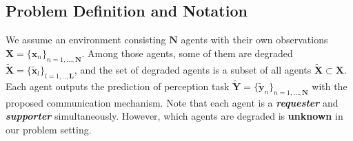 \subsection{Problem Definition and Notation}
We assume an environment consisting $\bm{N}$ agents with their own observations $\bm{X}=\{\bm{x}_n\}_{n=1,...,\bm{N}}$.
Among those agents, some of them are degraded $\tilde{\bm{X}} = \{\tilde{\bm{x}}_l\}_{l=1,..,\bm{L}}$, and the set of degraded agents is a subset of all agents $\tilde{\bm{X}}\subset\bm{X}$. 
Each agent outputs the prediction of perception task $\tilde{\bm{Y}}=\{\bm{\tilde{y}}_n\}_{n=1,...,\bm{N}}$ with the proposed communication mechanism. 
Note that each agent is a \textbf{\textit{requester}} and \textbf{\textit{supporter}} simultaneously. 
However, which agents are degraded is \textbf{unknown} in our problem setting.
